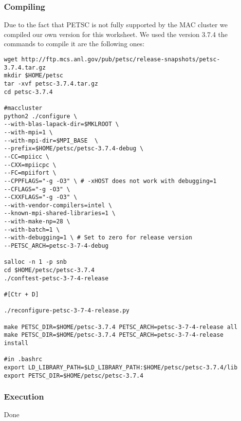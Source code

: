 \documentclass[a4paper]{article}
\begin{document}
\subsubsection{Compiling}
Due to the fact that PETSC is not fully supported by the MAC cluster we compiled our own version for this worksheet. We used the version 3.7.4 the commands to compile it are the following ones:
\begin{lstlisting}[caption=Debug version]
wget http://ftp.mcs.anl.gov/pub/petsc/release-snapshots/petsc-3.7.4.tar.gz
mkdir $HOME/petsc
tar -xvf petsc-3.7.4.tar.gz
cd petsc-3.7.4

#maccluster
python2 ./configure \
--with-blas-lapack-dir=$MKLROOT \
--with-mpi=1 \
--with-mpi-dir=$MPI_BASE  \
--prefix=$HOME/petsc/petsc-3.7.4-debug \
--CC=mpiicc \
--CXX=mpiicpc \
--FC=mpiifort \
--CPPFLAGS="-g -O3" \ # -xHOST does not work with debugging=1
--CFLAGS="-g -O3" \
--CXXFLAGS="-g -O3" \
--with-vendor-compilers=intel \
--known-mpi-shared-libraries=1 \
--with-make-np=28 \
--with-batch=1 \
--with-debugging=1 \ # Set to zero for release version
--PETSC_ARCH=petsc-3-7-4-debug

salloc -n 1 -p snb
cd $HOME/petsc/petsc-3.7.4
./conftest-petsc-3-7-4-release

#[Ctr + D]

./reconfigure-petsc-3-7-4-release.py

make PETSC_DIR=$HOME/petsc-3.7.4 PETSC_ARCH=petsc-3-7-4-release all
make PETSC_DIR=$HOME/petsc-3.7.4 PETSC_ARCH=petsc-3-7-4-release install

#in .bashrc
export LD_LIBRARY_PATH=$LD_LIBRARY_PATH:$HOME/petsc/petsc-3.7.4/lib
export PETSC_DIR=$HOME/petsc/petsc-3.7.4
\end{lstlisting}





\subsubsection{Execution}
Done
\end{document}

